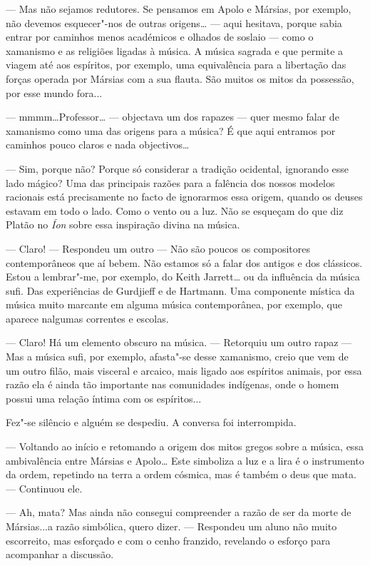 --- Mas não sejamos redutores. Se pensamos em Apolo e Mársias, por
exemplo, não devemos esquecer"-nos de outras origens\ldots{} --- aqui
hesitava, porque sabia entrar por caminhos menos académicos e olhados de
soslaio --- como o xamanismo e as religiões ligadas à música. A música
sagrada e que permite a viagem até aos espíritos, por exemplo, uma
equivalência para a libertação das forças operada por Mársias com a sua
flauta. São muitos os mitos da possessão, por esse mundo fora...

--- mmmm\ldots{}Professor\ldots{} --- objectava um dos rapazes --- quer mesmo
falar de xamanismo como uma das origens para a música? É que aqui
entramos por caminhos pouco claros e nada objectivos\ldots{}

--- Sim, porque não? Porque só considerar a tradição ocidental, ignorando
esse lado mágico? Uma das principais razões para a falência dos nossos
modelos racionais está precisamente no facto de ignorarmos essa origem,
quando os deuses estavam em todo o lado. Como o vento ou a luz. Não se
esqueçam do que diz Platão no \emph{Íon }sobre essa inspiração divina na
música.

--- Claro! --- Respondeu um outro --- Não são poucos os compositores
contemporâneos que aí bebem. Não estamos só a falar dos antigos e dos
clássicos. Estou a lembrar"-me, por exemplo, do Keith Jarrett\ldots{} ou
da influência da música sufi. Das experiências de Gurdjieff e de
Hartmann. Uma componente mística da música muito marcante em alguma
música contemporânea, por exemplo, que aparece nalgumas correntes e
escolas.

--- Claro! Há um elemento obscuro na música. --- Retorquiu um outro rapaz ---
Mas a música sufi, por exemplo, afasta"-se desse xamanismo, creio que vem
de um outro filão, mais visceral e arcaico, mais ligado aos espíritos
animais, por essa razão ela é ainda tão importante nas comunidades
indígenas, onde o homem possui uma relação íntima com os espíritos...

Fez"-se silêncio e alguém se despediu. A conversa foi interrompida.

--- Voltando ao início e retomando a origem dos mitos gregos sobre a
música, essa ambivalência entre Mársias e Apolo\ldots{} Este simboliza a
luz e a lira é o instrumento da ordem, repetindo na terra a ordem
cósmica, mas é também o deus que mata. --- Continuou ele.

--- Ah, mata? Mas ainda não consegui compreender a razão de ser da morte
de Mársias...a razão simbólica, quero dizer. --- Respondeu um aluno não
muito escorreito, mas esforçado e com o cenho franzido, revelando o
esforço para acompanhar a discussão.

